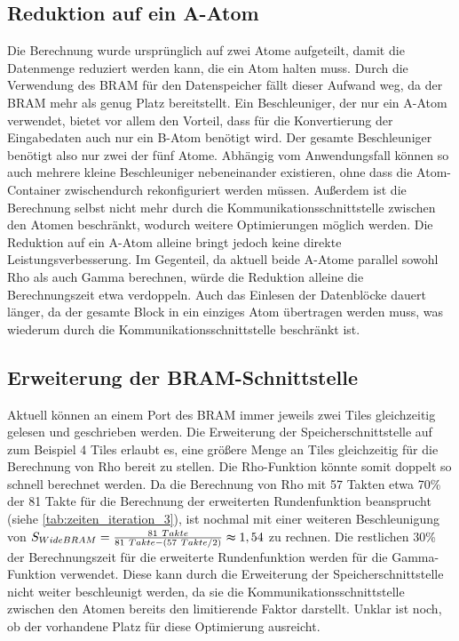 \subsection{Reduktion auf ein A-Atom}
Die Berechnung wurde ursprünglich auf zwei Atome aufgeteilt, damit die Datenmenge reduziert werden kann, die ein Atom halten muss.
Durch die Verwendung des BRAM für den Datenspeicher fällt dieser Aufwand weg, da der BRAM mehr als genug Platz bereitstellt.
Ein Beschleuniger, der nur ein A-Atom verwendet, bietet vor allem den Vorteil, dass für die Konvertierung der Eingabedaten auch nur ein B-Atom benötigt wird.
Der gesamte Beschleuniger benötigt also nur zwei der fünf Atome. Abhängig vom Anwendungsfall können so auch mehrere kleine Beschleuniger nebeneinander existieren,
ohne dass die Atom-Container zwischendurch rekonfiguriert werden müssen.
Außerdem ist die Berechnung selbst nicht mehr durch die Kommunikationsschnittstelle zwischen den Atomen beschränkt, wodurch weitere Optimierungen möglich werden.
Die Reduktion auf ein A-Atom alleine bringt jedoch keine direkte Leistungsverbesserung. Im Gegenteil, da aktuell beide A-Atome parallel sowohl Rho als auch Gamma berechnen,
würde die Reduktion alleine die Berechnungszeit etwa verdoppeln. Auch das Einlesen der Datenblöcke dauert länger, da der gesamte Block in ein einziges Atom übertragen werden muss,
was wiederum durch die Kommunikationsschnittstelle beschränkt ist. 

\subsection{Erweiterung der BRAM-Schnittstelle}
Aktuell können an einem Port des BRAM immer jeweils zwei Tiles gleichzeitig gelesen und geschrieben werden.
Die Erweiterung der Speicherschnittstelle auf zum Beispiel 4 Tiles erlaubt es,
eine größere Menge an Tiles gleichzeitig für die Berechnung von Rho bereit zu stellen.
Die Rho-Funktion könnte somit doppelt so schnell berechnet werden. Da die Berechnung von Rho mit 57 Takten
etwa 70\% der 81 Takte für die Berechnung der erweiterten Rundenfunktion beansprucht (siehe \ref{tab:zeiten_iteration_3}),
ist nochmal mit einer weiteren Beschleunigung von $S_{WideBRAM} = \frac{81\ Takte}{81\ Takte - (57\ Takte / 2)} \thickapprox 1,54$ zu rechnen.
Die restlichen 30\% der Berechnungszeit für die erweiterte Rundenfunktion werden für die Gamma-Funktion verwendet.
Diese kann durch die Erweiterung der Speicherschnittstelle nicht weiter beschleunigt werden,
da sie die Kommunikationsschnittstelle zwischen den Atomen bereits den limitierende Faktor darstellt.
Unklar ist noch, ob der vorhandene Platz für diese Optimierung ausreicht.

